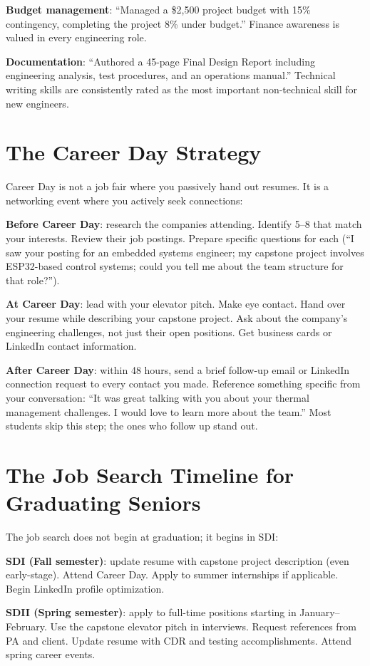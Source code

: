 \textbf{Budget management}: ``Managed a \$2,500 project budget with 15\% contingency, completing the project 8\% under budget.'' Finance awareness is valued in every engineering role.

\textbf{Documentation}: ``Authored a 45-page Final Design Report including engineering analysis, test procedures, and an operations manual.'' Technical writing skills are consistently rated as the most important non-technical skill for new engineers.

\section{The Career Day Strategy}
Career Day is not a job fair where you passively hand out resumes. It is a networking event where you actively seek connections:

\textbf{Before Career Day}: research the companies attending. Identify 5--8 that match your interests. Review their job postings. Prepare specific questions for each (``I saw your posting for an embedded systems engineer; my capstone project involves ESP32-based control systems; could you tell me about the team structure for that role?'').

\textbf{At Career Day}: lead with your elevator pitch. Make eye contact. Hand over your resume while describing your capstone project. Ask about the company's engineering challenges, not just their open positions. Get business cards or LinkedIn contact information.

\textbf{After Career Day}: within 48 hours, send a brief follow-up email or LinkedIn connection request to every contact you made. Reference something specific from your conversation: ``It was great talking with you about your thermal management challenges. I would love to learn more about the team.'' Most students skip this step; the ones who follow up stand out.



\section{The Job Search Timeline for Graduating Seniors}
The job search does not begin at graduation; it begins in SDI:

\textbf{SDI (Fall semester)}: update resume with capstone project description (even early-stage). Attend Career Day. Apply to summer internships if applicable. Begin LinkedIn profile optimization.

\textbf{SDII (Spring semester)}: apply to full-time positions starting in January--February. Use the capstone elevator pitch in interviews. Request references from PA and client. Update resume with CDR and testing accomplishments. Attend spring career events.

